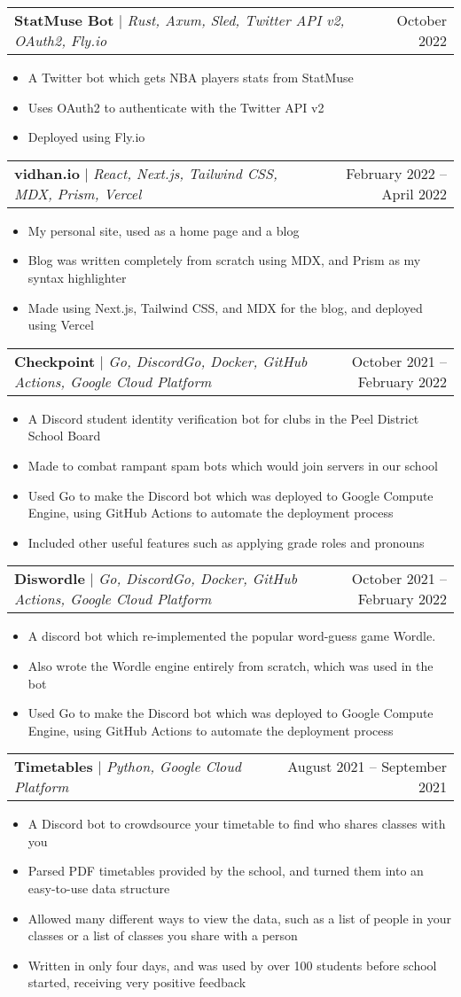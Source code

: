 \documentclass[letterpaper,11pt]{article}
\makeatletter
\newcommand{\resumeItem}[1]{
  \item\small{
    {#1 \vspace{-2pt}}
  }
}
\newcommand{\resumeProjectHeading}[2]{
    \item
    \begin{tabular*}{0.97\textwidth}{l@{\extracolsep{\fill}}r}
      \small#1 & #2 \\
    \end{tabular*}\vspace{-7pt}
}
\newcommand{\resumeItemListStart}{\begin{itemize}}
\newcommand{\resumeItemListEnd}{\end{itemize}\vspace{-5pt}}
\makeatother
\begin{document}
\resumeProjectHeading
{\textbf{StatMuse Bot} $|$ \emph{Rust, Axum, Sled, Twitter API v2, OAuth2, Fly.io}}{October 2022}
\resumeItemListStart
\resumeItem{A Twitter bot which gets NBA players stats from StatMuse}
\resumeItem{Uses OAuth2 to authenticate with the Twitter API v2}
\resumeItem{Deployed using Fly.io}
\resumeItemListEnd

\resumeProjectHeading
{\textbf{vidhan.io} $|$ \emph{React, Next.js, Tailwind CSS, MDX, Prism, Vercel}}{February 2022 -- April 2022}
\resumeItemListStart
\resumeItem{My personal site, used as a home page and a blog}
\resumeItem{Blog was written completely from scratch using MDX, and Prism as my syntax highlighter}
\resumeItem{Made using Next.js, Tailwind CSS, and MDX for the blog, and deployed using Vercel}
\resumeItemListEnd

\resumeProjectHeading
{\textbf{Checkpoint} $|$ \emph{Go, DiscordGo, Docker, GitHub Actions, Google Cloud Platform}}{October 2021 -- February 2022}
\resumeItemListStart
\resumeItem{A Discord student identity verification bot for clubs in the Peel District School Board}
\resumeItem{Made to combat rampant spam bots which would join servers in our school}
\resumeItem{Used Go to make the Discord bot which was deployed to Google Compute Engine, using GitHub Actions to automate the deployment process}
\resumeItem{Included other useful features such as applying grade roles and pronouns}
\resumeItemListEnd

\resumeProjectHeading
{\textbf{Diswordle} $|$ \emph{Go, DiscordGo, Docker, GitHub Actions, Google Cloud Platform}}{October 2021 -- February 2022}
\resumeItemListStart
\resumeItem{A discord bot which re-implemented the popular word-guess game Wordle.}
\resumeItem{Also wrote the Wordle engine entirely from scratch, which was used in the bot}
\resumeItem{Used Go to make the Discord bot which was deployed to Google Compute Engine, using GitHub Actions to automate the deployment process}
\resumeItemListEnd

\resumeProjectHeading
{\textbf{Timetables} $|$ \emph{Python, Google Cloud Platform}}{August 2021 -- September 2021}
\resumeItemListStart
\resumeItem{A Discord bot to crowdsource your timetable to find who shares classes with you}
\resumeItem{Parsed PDF timetables provided by the school, and turned them into an easy-to-use data structure}
\resumeItem{Allowed many different ways to view the data, such as a list of people in your classes or a list of classes you share with a person}
\resumeItem{Written in only four days, and was used by over 100 students before school started, receiving very positive feedback}
\resumeItemListEnd
\end{document}
